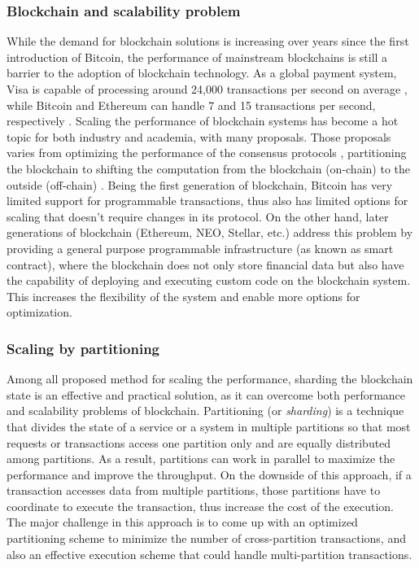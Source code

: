 \subsubsection{Blockchain and scalability problem}
While the demand for blockchain solutions is increasing over years since the
first introduction of Bitcoin, the performance of mainstream blockchains is
still a barrier to the adoption of blockchain technology. As a global payment
system, Visa is capable of processing around 24,000 transactions per second on
average \cite{visa}, while Bitcoin and Ethereum can handle 7 and 15 transactions per second, 
respectively \cite{ethereum:sharding, nakamoto2019bitcoin}. Scaling the
performance of blockchain systems has become a hot topic for both industry and
academia, with many proposals. Those proposals varies from optimizing the
performance of the consensus protocols \cite{dang2019towards}, partitioning the
blockchain \cite{wang2019sok} to shifting the computation from the blockchain
(on-chain) to the outside (off-chain) \cite{teutsch2019scalable,
network2018cheap}. Being the first generation of blockchain, Bitcoin has very
limited support for programmable transactions, thus also has limited options for
scaling that doesn't require changes in its protocol. On the other hand, later
generations of blockchain (Ethereum, NEO, Stellar, etc.) address this problem by
providing a general purpose programmable infrastructure (as known as smart
contract), where the blockchain does not only store financial data but also have
the capability of deploying and executing custom code on the blockchain system.
This increases the flexibility of the system and enable more options for
optimization.

\subsubsection{Scaling by partitioning}
Among all proposed method for scaling the performance, sharding the blockchain
state is an effective and practical solution, as it can overcome both
performance and scalability problems of blockchain. Partitioning (or
\emph{sharding}) is a technique that divides the state of a service or a system
in multiple partitions so that most requests or transactions access one
partition only and are equally distributed among partitions. As a result,
partitions can work in parallel to maximize the performance and improve the
throughput. On the downside of this approach, if a transaction accesses data
from multiple partitions, those partitions have to coordinate to execute the
transaction, thus increase the cost of the execution. The major challenge in
this approach is to come up with an optimized partitioning scheme to minimize
the number of cross-partition transactions, and also an effective execution
scheme that could handle multi-partition transactions.

